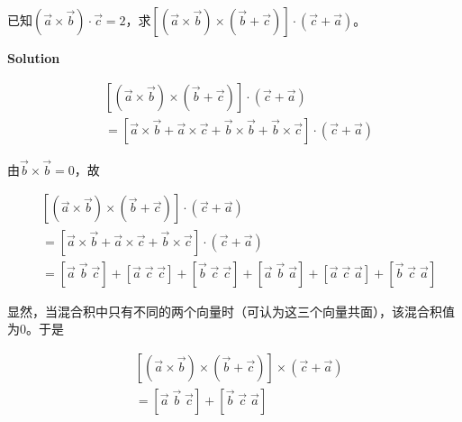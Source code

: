 \documentclass[
	11pt, %
	a4paper, %
]{WhuSakuraBook}
\begin{document}
    已知\((\overrightarrow{a} \times \overrightarrow{b}) \cdot \overrightarrow{c} = 2\)，求\(\left[(\overrightarrow{a} \times \overrightarrow{b}) \times
    (\overrightarrow{b} + \overrightarrow{c})\right] \cdot (\overrightarrow{c} + \overrightarrow{a})\)。

    \textbf{Solution}
    \vspace{1em}


    \[
        \begin{split}
            & \left[(\overrightarrow{a} \times \overrightarrow{b}) \times (\overrightarrow{b} + \overrightarrow{c})\right] \cdot (\overrightarrow{c} + \overrightarrow{a})
            \\
            &= \left[\overrightarrow{a} \times \overrightarrow{b} + \overrightarrow{a} \times \overrightarrow{c} + \overrightarrow{b} \times \overrightarrow{b} +
            \overrightarrow{b} \times \overrightarrow{c}\right] \cdot (\overrightarrow{c} + \overrightarrow{a})
        \end{split}
    \]

    由\(\overrightarrow{b} \times \overrightarrow{b} = 0\)，故
    \vspace{1em}

    \[
        \begin{split}
            & \left[(\overrightarrow{a} \times \overrightarrow{b}) \times (\overrightarrow{b} + \overrightarrow{c})\right] \cdot (\overrightarrow{c} + \overrightarrow{a})
            \\
            &= \left[\overrightarrow{a} \times \overrightarrow{b} + \overrightarrow{a} \times \overrightarrow{c} + \overrightarrow{b} \times \overrightarrow{c}\right]
            \cdot (\overrightarrow{c} + \overrightarrow{a})
            \\
            &= \left[\overrightarrow{a} \; \overrightarrow{b} \; \overrightarrow{c}\right] + \left[\overrightarrow{a} \; \overrightarrow{c} \; \overrightarrow{c}\right] + 
            \left[\overrightarrow{b} \; \overrightarrow{c} \; \overrightarrow{c}\right] + \left[\overrightarrow{a} \; \overrightarrow{b} \; \overrightarrow{a}\right] +
            \left[\overrightarrow{a} \; \overrightarrow{c} \; \overrightarrow{a}\right] + \left[\overrightarrow{b} \; \overrightarrow{c} \; \overrightarrow{a}\right]
        \end{split}
    \]

    显然，当混合积中只有不同的两个向量时（可认为这三个向量共面），该混合积值为0。于是

    \[
        \begin{split}
            & \left[(\overrightarrow{a} \times \overrightarrow{b}) \times (\overrightarrow{b} + \overrightarrow{c})\right] \times (\overrightarrow{c} + \overrightarrow{a})
            \\
            &= \left[\overrightarrow{a} \; \overrightarrow{b} \; \overrightarrow{c}\right] + \left[\overrightarrow{b} \; \overrightarrow{c} \; \overrightarrow{a}\right]
        \end{split}
    \]
\end{document}
